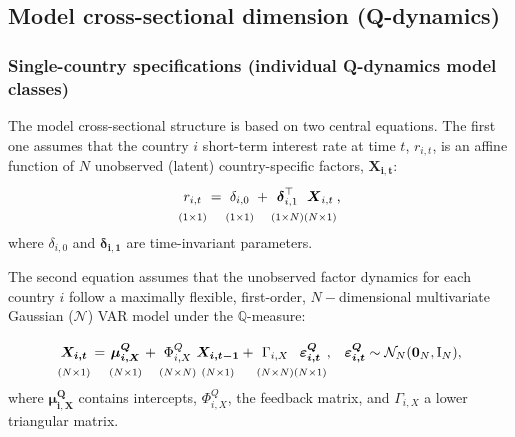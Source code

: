 \subsection{Model cross-sectional dimension (Q-dynamics)}\label{S:Qdyn}

\subsubsection{Single-country specifications (individual Q-dynamics model classes)}\label{single-country-specifications-individual-q-dynamics-model-classes}

The model cross-sectional structure is based on two central equations. The first one assumes that the country \(i\) short-term interest rate at time \(t\), \(r_{i,t}\), is an affine function of \(N\) unobserved (latent) country-specific factors, \(\boldsymbol{X_{i,t}}\):
\begin{equation}
\underset{(1 \times 1)}{\vphantom{\Big|}
r_{i,t}} =
\underset{(1 \times 1)}{
\vphantom{\Big|}
\delta_{i,0}} +
\underset{(1 \times N)}{%
\vphantom{\Big|}
\boldsymbol{\delta}_{i,1}^{\top}}
\underset{(N \times 1)}{%
\vphantom{\Big|}
\boldsymbol{X}_{i,t}}\text{,}
\label{eq:ShortRate}
\end{equation}
where \(\delta_{i,0}\) and \(\boldsymbol{\delta_{i,1}}\) are time-invariant parameters.

The second equation assumes that the unobserved factor dynamics for each country \(i\) follow a maximally flexible, first-order, \(N-\)dimensional multivariate Gaussian (\(\mathcal{N}\)) VAR model under the \(\mathbb{Q}\)-measure:

\begin{align}
&   \underset{(N \times 1)}{\boldsymbol{\vphantom{\Big|}
X_{i,t}}} =
\underset{(N \times 1)}{\boldsymbol{\vphantom{\Big|}
\mu^{Q}_{i,X}}} +
\underset{(N \times N)}{\vphantom{\Big|}
\Phi^{Q}_{i,X}}
\underset{(N \times 1)}{\boldsymbol{\vphantom{\Big|}
X_{i,t-1}}} +
\underset{(N \times N)}{\vphantom{\Big|}
\Gamma_{i,X}}
\underset{(N \times 1)}{\boldsymbol{\vphantom{\Big|}
\varepsilon_{i,t}^{Q}}}\text{,}
    &  \boldsymbol{\varepsilon_{i,t}^{Q}}\sim {\mathcal{N}_N}(\boldsymbol{0}_N,\mathrm{I}_N)\text{,}
    \label{eq:VARQ}
\end{align}
where \(\boldsymbol{\mu^{Q}_{i,X}}\) contains intercepts, \(\Phi^{Q}_{i,X}\), the feedback matrix, and \(\Gamma_{i,X}\) a lower triangular matrix.

